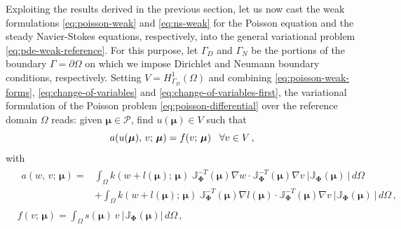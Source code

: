 \documentclass[12pt, a4paper, twoside, openright, notitlepage]{report}
\numberwithin{equation}{chapter}
\theoremstyle{theorem}
\theoremstyle{definition}
\theoremstyle{remark}
\theoremstyle{proposition}
\numberwithin{figure}{chapter}
\newcommand{\bg}[1]{\boldsymbol{#1}}
\begin{document}
		Exploiting the results derived in the previous section, let us now cast the weak formulations \eqref{eq:poisson-weak} and \eqref{eq:ns-weak} for the Poisson equation and the steady Navier-Stokes equations, respectively, into the general variational problem \eqref{eq:pde-weak-reference}. For this purpose, let $\Gamma_D$ and $\Gamma_N$ be the portions of the boundary $\Gamma = \partial \Omega$ on which we impose Dirichlet and Neumann boundary conditions, respectively. Setting $V = H^1_{\Gamma_D}(\Omega)$ and combining \eqref{eq:poisson-weak-forms}, \eqref{eq:change-of-variables} and \eqref{eq:change-of-variables-first}, the variational formulation of the Poisson problem \eqref{eq:poisson-differential} over the reference domain $\Omega$ reads: given $\bg{\mu} \in \mathcal{P}$, find $u(\bg{\mu}) \in V$ such that
		\begin{equation}
			\label{eq:poisson-weak-reference}
			a(u(\bg{\mu}), \, v; \, \bg{\mu}) = f(v; \, \bg{\mu}) \hspace*{0.3cm} \forall v \in V \, ,
		\end{equation}
		with
		\begin{subequations}
			\label{eq:poisson-weak-forms-reference}
			\begin{align}
				\label{eq:poisson-weak-forms-reference-first}
				&
				\begin{aligned}
				a(w, \, v; \, \bg{\mu}) = & \int_{\Omega} k(w + l(\bg{\mu}); \, \bg{\mu}) ~ \mathbb{J}^{-T}_{\bg{\Phi}}(\bg{\mu}) \nabla w \cdot \mathbb{J}^{-T}_{\bg{\Phi}}(\bg{\mu}) \nabla v ~ \lvert \mathbb{J}_{\bg{\Phi}}(\bg{\mu}) ~ \rvert \, d \Omega \\
				& + \int_{\Omega} k(w + l(\bg{\mu}); \, \bg{\mu}) ~ \mathbb{J}^{-T}_{\bg{\Phi}}(\bg{\mu}) \nabla l(\bg{\mu}) \cdot \mathbb{J}^{-T}_{\bg{\Phi}}(\bg{\mu}) \nabla v ~ \lvert \mathbb{J}_{\bg{\Phi}}(\bg{\mu}) ~ \rvert \, d \Omega \, ,
				\end{aligned} \\
				\label{eq:poisson-weak-forms-reference-second}
				& f(v; \, \bg{\mu}) = \int_{\Omega} s(\bg{\mu}) ~ v ~ \lvert \mathbb{J}_{\bg{\Phi}}(\bg{\mu}) \rvert \, d \Omega \, ,  
			\end{align}
		\end{subequations}
\end{document}
